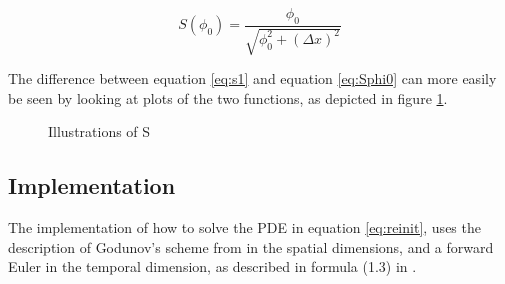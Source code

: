 \begin{equation}
\label{eq:Sphi0}
S(\phi_0) = \frac{\phi_0}{\sqrt{\phi_0^2 + (\Delta x)^2}}
\end{equation}

The difference between equation \eqref{eq:s1} and equation
\eqref{eq:Sphi0} can more easily be seen by looking at plots of the
two functions, as depicted in figure \ref{fig:s-graph}.

\begin{figure}[h]
\begin{center}
\end{center}
\caption{Illustrations of S}
\label{fig:s-graph}
\end{figure}



\pagebreak
\subsection{Implementation}
The implementation of how to solve the PDE in equation \eqref{eq:reinit},
uses the description of Godunov's scheme from
 in the spatial dimensions, and a
forward Euler in the temporal dimension, as described in formula
(1.3) in .

